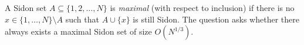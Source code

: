 A Sidon set $A\subseteq\{1,2,\dots,N\}$ is \emph{maximal} (with respect to inclusion) if there is no $x\in\{1,\dots,N\}\setminus A$ such that $A\cup\{x\}$ is still Sidon.
The question asks whether there always exists a maximal Sidon set of size $O(N^{1/3})$.
